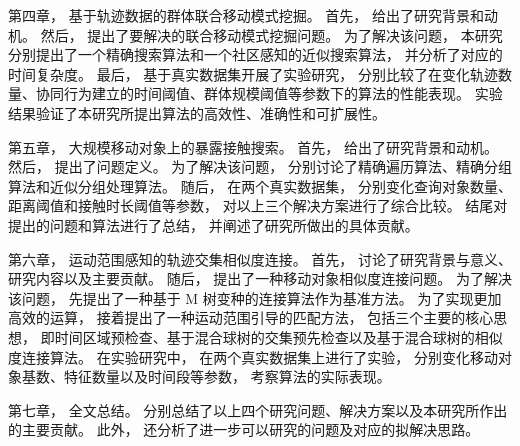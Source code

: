 第四章， 基于轨迹数据的群体联合移动模式挖掘。 首先， 给出了研究背景和动机。 然后， 提出了要解决的联合移动模式挖掘问题。 为了解决该问题， 本研究分别提出了一个精确搜索算法和一个社区感知的近似搜索算法， 并分析了对应的时间复杂度。 最后， 基于真实数据集开展了实验研究， 分别比较了在变化轨迹数量、协同行为建立的时间阈值、群体规模阈值等参数下的算法的性能表现。 实验结果验证了本研究所提出算法的高效性、准确性和可扩展性。

第五章， 大规模移动对象上的暴露接触搜索。 首先， 给出了研究背景和动机。 然后， 提出了问题定义。 为了解决该问题， 分别讨论了精确遍历算法、精确分组算法和近似分组处理算法。 随后， 在两个真实数据集， 分别变化查询对象数量、距离阈值和接触时长阈值等参数， 对以上三个解决方案进行了综合比较。 结尾对提出的问题和算法进行了总结， 并阐述了研究所做出的具体贡献。

第六章， 运动范围感知的轨迹交集相似度连接。 首先， 讨论了研究背景与意义、研究内容以及主要贡献。 随后， 提出了一种移动对象相似度连接问题。 为了解决该问题， 先提出了一种基于 M 树变种的连接算法作为基准方法。 为了实现更加高效的运算， 接着提出了一种运动范围引导的匹配方法， 包括三个主要的核心思想， 即时间区域预检查、基于混合球树的交集预先检查以及基于混合球树的相似度连接算法。 在实验研究中， 在两个真实数据集上进行了实验， 分别变化移动对象基数、特征数量以及时间段等参数， 考察算法的实际表现。


第七章， 全文总结。 分别总结了以上四个研究问题、解决方案以及本研究所作出的主要贡献。 此外， 还分析了进一步可以研究的问题及对应的拟解决思路。
